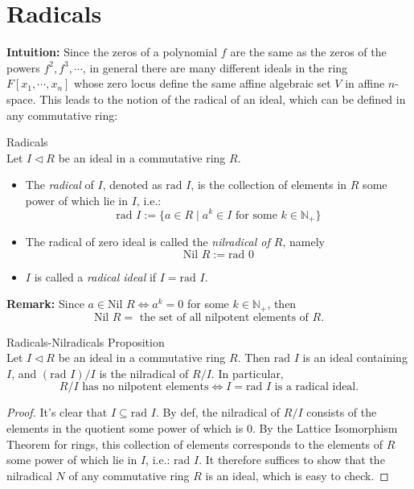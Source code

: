 \section{Radicals}

\noindent\textbf{Intuition:} Since the zeros of a polynomial $f$ are the same as the zeros of the powers $f^2, f^3 ,\cdots$, in general there are many different ideals in the ring $F[x_1 ,\cdots, x_n]$ whose zero locus define the same affine algebraic set $V$ in affine $n$-space. This leads to the notion of the radical of an ideal, which can be defined in any commutative ring:

\begin{definition}{Radicals}\\
Let $I \triangleleft R$ be an ideal in a commutative ring $R$.
\begin{itemize}
    \item The \textit{radical} of $I$, denoted as $\text{rad } I$, is the collection of elements in $R$ some power of which lie in $I$, i.e.: 
    \[
    \text{rad }I := \{a\in R \mid a^k \in I \text{ for some } k\in \mathbb{N}_+\}
    \]

    \item The radical of zero ideal is called the \textit{nilradical of $R$}, namely
    $$\text{Nil } R:= \text{rad }0$$

    \item $I$ is called a \textit{radical ideal} if $I= \text{rad }I$.
\end{itemize}
\end{definition}

\noindent\textbf{Remark:} Since $a \in \text{Nil }R \Leftrightarrow a^k=0$ for some $k \in \mathbb{N}_+$, then
\[
\text{Nil } R = \text{ the set of all nilpotent elements of } R.
\]

\begin{proposition}{Radicals-Nilradicals Proposition}\\
Let $I \triangleleft R$ be an ideal in a commutative ring $R$. Then $\text{rad }I$ is an ideal containing $I$, and $(\text{rad }I)/I$ is the nilradical of $R/I$. In particular,
\[
R/I \text{ has no nilpotent elements} \Leftrightarrow I= \text{rad }I \text{ is a radical ideal.}
\]
\end{proposition}

\begin{proof}
    It's clear that $I \subseteq \text{rad }I$. By def, the nilradical of $R/I$ consists of the elements in the quotient some power of which is $0$. By the Lattice Isomorphism Theorem for rings, this collection of elements corresponds to the elements of $R$ some power of which lie in $I$, i.e.: $\text{rad }I$. It therefore suffices to show that the nilradical $N$ of any commutative ring $R$ is an ideal, which is easy to check.
\end{proof}

